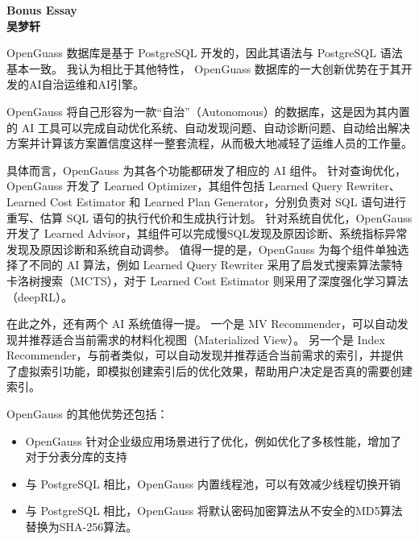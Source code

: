 \documentclass[a4paper,12pt]{ctexart}
\begin{document}
\begin{center}
	{\Large \bf Bonus Essay} \\
	\bf 吴梦轩
\end{center}  

OpenGuass 数据库是基于 PostgreSQL 开发的，因此其语法与 PostgreSQL 语法基本一致。
我认为相比于其他特性， OpenGuass 数据库的一大创新优势在于其开发的AI自治运维和AI引擎。

OpenGauss 将自己形容为一款“自治”（Autonomous）的数据库，这是因为其内置的 AI 工具可以完成自动优化系统、自动发现问题、自动诊断问题、自动给出解决方案并计算该方案置信度这样一整套流程，从而极大地减轻了运维人员的工作量。

具体而言，OpenGauss 为其各个功能都研发了相应的 AI 组件\cite{10.14778/3476311.3476380}。
针对查询优化，OpenGauss 开发了 Learned Optimizer，其组件包括 Learned Query Rewriter、Learned Cost Estimator 和 Learned Plan Generator，分别负责对 SQL 语句进行重写、估算 SQL 语句的执行代价和生成执行计划。
针对系统自优化，OpenGauss 开发了 Learned Advisor，其组件可以完成慢SQL发现及原因诊断、系统指标异常发现及原因诊断和系统自动调参。
值得一提的是，OpenGauss 为每个组件单独选择了不同的 AI 算法，例如 Learned Query Rewriter 采用了启发式搜索算法蒙特卡洛树搜索（MCTS），对于 Learned Cost Estimator 则采用了深度强化学习算法（deepRL）。


在此之外，还有两个 AI 系统值得一提。
一个是 MV Recommender，可以自动发现并推荐适合当前需求的材料化视图（Materialized View）。
另一个是 Index Recommender，与前者类似，可以自动发现并推荐适合当前需求的索引，并提供了虚拟索引功能，即模拟创建索引后的优化效果，帮助用户决定是否真的需要创建索引。

\vspace{0.5cm}

OpenGauss 的其他优势还包括：
\begin{itemize}
	\item OpenGauss 针对企业级应用场景进行了优化，例如优化了多核性能，增加了对于分表分库的支持
	\item 与 PostgreSQL 相比，OpenGauss 内置线程池，可以有效减少线程切换开销
	\item 与 PostgreSQL 相比，OpenGauss 将默认密码加密算法从不安全的MD5算法替换为SHA-256算法。
\end{itemize}

\newpage



\end{document}
